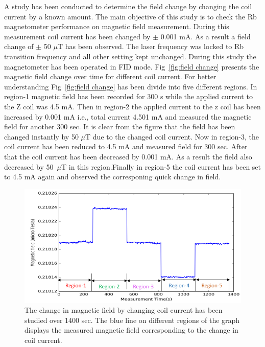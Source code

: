 \begin{itemize}
 A study has been conducted to determine the field change by changing the coil current by a known amount. The main objective of this study is to check the Rb magnetometer performance on magnetic field measurement. During this measurement coil current has been changed by $\pm$ 0.001 mA. As a result a field change of $\pm$ 50  $\mu$T  has been observed. The laser frequency was locked to Rb transition frequency and all other setting kept unchanged. During this study the magnetometer has been operated in FID mode. Fig~\ref{fig:field change} presents the magnetic field change over time for different coil current. For better understanding Fig~\ref{fig:field change} has been divide into five different regions. In region-1 magnetic field  has been recorded for 300 s while the applied current to the Z coil was 4.5 mA. Then in region-2 the applied current to the z coil has been increased by 0.001 mA i.e., total current 4.501 mA and measured the magnetic field for another 300 sec. It is clear from the figure that the field has been changed instantly by 50 $\mu$T due to the changed coil current. Now in region-3, the coil current has been reduced to 4.5 mA and measured field for 300 sec. After that the coil current has been decreased by 0.001 mA. As a result the field also decreased by 50~$\mu$T in this region.Finally in region-5 the coil current has been set to 4.5 mA again and observed the corresponing quick change in field.

   \begin{figure}[h]
\centering\includegraphics[width=0.7\linewidth]{figures/field_change_with_current}
  
\caption{The change in magnetic field  by changing coil current has been studied over 1400 sec. The blue line on different regions of the graph displays the measured magnetic field corresponding to the change in coil current. \label{fig:different sample rate}}
\end{figure}
   \end{itemize}
